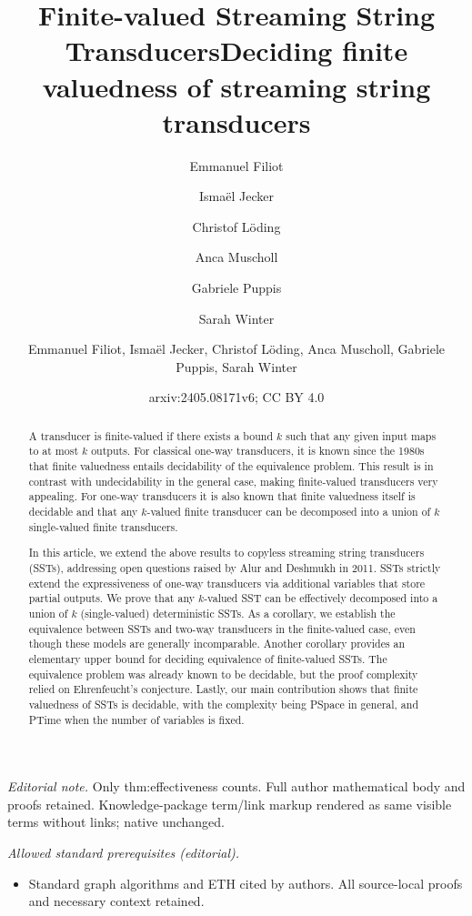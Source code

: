 \documentclass{article}
\author{Emmanuel Filiot \and Ismaël Jecker \and Christof Löding \and Anca Muscholl \and Gabriele Puppis \and Sarah Winter}\date{}
\title{Finite-valued Streaming String Transducers}
\title{Deciding finite valuedness of streaming string transducers}
\author{Emmanuel Filiot, Ismaël Jecker, Christof Löding, Anca Muscholl, Gabriele Puppis, Sarah Winter}
\date{arxiv:2405.08171v6; CC BY 4.0}
\begin{document}
\maketitle
\noindent\textit{Editorial note.} Only thm:effectiveness counts. Full author mathematical body and proofs retained. Knowledge-package term/link markup rendered as same visible terms without links; native unchanged.\par\medskip
\noindent\textit{Allowed standard prerequisites (editorial).}\begin{itemize}
\item Standard graph algorithms and ETH cited by authors. All source-local proofs and necessary context retained.
\end{itemize}\medskip

\maketitle


\begin{abstract}
       A  transducer is finite-valued if there exists a bound
    $k$ such that any given
    input maps to at most $k$ outputs. For classical
    one-way transducers, it is known since the 1980s that
    finite valuedness entails decidability of the equivalence
    problem. This result is in contrast with undecidability in the
    general case, making finite-valued transducers
    very appealing. For one-way transducers it is also known that
    finite valuedness itself is decidable and that any
    $k$-valued finite transducer can be decomposed into a union of $k$
    single-valued finite transducers. 


    In this article, we extend the above results to copyless streaming string
    transducers (SSTs), addressing open questions raised by Alur and
    Deshmukh in 2011. SSTs strictly extend the expressiveness of
    one-way transducers via additional variables that store
    partial outputs. We prove that any $k$-valued SST can be
    effectively decomposed into a union of $k$ (single-valued)
    deterministic SSTs. As a corollary, we establish the equivalence
    between SSTs and two-way transducers in the finite-valued case, even though these models are generally incomparable. Another corollary provides an elementary upper bound for
    deciding equivalence of finite-valued SSTs. The equivalence problem was already
    known to be decidable, but the proof complexity relied
    on Ehrenfeucht's
    conjecture. Lastly, our main contribution shows that finite valuedness of SSTs is
    decidable, with the complexity  being {\upshape\sc PSpace} in general, and  {\upshape\sc PTime} when the
    number of variables is fixed.  
\end{abstract}
\end{document}
